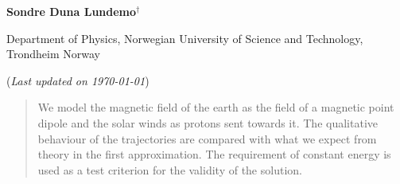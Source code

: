


	
	\begin{center}
	\setlength{\parskip}{0em}
	\thispagestyle{titlepage}
	

	\vspace{4mm}
	
	\large{\textbf{Sondre Duna Lundemo}}$^\dagger$
	
	\small{Department of Physics, Norwegian University of Science and Technology, Trondheim Norway 
	}

	(\textit{Last updated on \today})
	\end{center}
	\vspace{-1.5cm}
	\begin{abstract}
		We model the magnetic field of the earth as the field of a magnetic point dipole and the solar winds as protons sent towards it. The qualitative behaviour of the trajectories are compared with what we expect from theory in the first approximation.
		The requirement of constant energy is used as a test criterion for the validity of the solution.
	\end{abstract}
	
\setlength{\parskip}{1em}









